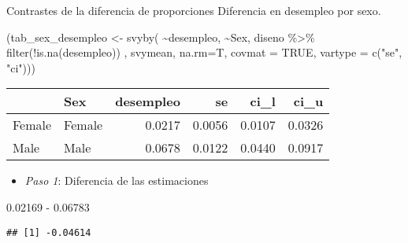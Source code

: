 \documentclass[
  ignorenonframetext,
]{beamer}
\newenvironment{Shaded}{\begin{snugshade}}{\end{snugshade}}
\newcommand{\AttributeTok}[1]{\textcolor[rgb]{0.77,0.63,0.00}{#1}}
\newcommand{\ConstantTok}[1]{\textcolor[rgb]{0.00,0.00,0.00}{#1}}
\newcommand{\FloatTok}[1]{\textcolor[rgb]{0.00,0.00,0.81}{#1}}
\newcommand{\FunctionTok}[1]{\textcolor[rgb]{0.00,0.00,0.00}{#1}}
\newcommand{\NormalTok}[1]{#1}
\newcommand{\OtherTok}[1]{\textcolor[rgb]{0.56,0.35,0.01}{#1}}
\newcommand{\SpecialCharTok}[1]{\textcolor[rgb]{0.00,0.00,0.00}{#1}}
\newcommand{\StringTok}[1]{\textcolor[rgb]{0.31,0.60,0.02}{#1}}
\providecommand{\tightlist}{%
  \setlength{\itemsep}{0pt}\setlength{\parskip}{0pt}}
\begin{document}
\begin{frame}[fragile]{Contrastes de la diferencia de proporciones}
\protect\hypertarget{contrastes-de-la-diferencia-de-proporciones-1}{}
Diferencia en desempleo por sexo.

\begin{Shaded}
\begin{Highlighting}[]
\NormalTok{(tab\_sex\_desempleo }\OtherTok{\textless{}{-}} \FunctionTok{svyby}\NormalTok{(}
  \SpecialCharTok{\textasciitilde{}}\NormalTok{desempleo, }\SpecialCharTok{\textasciitilde{}}\NormalTok{Sex, }
\NormalTok{    diseno }\SpecialCharTok{\%\textgreater{}\%} \FunctionTok{filter}\NormalTok{(}\SpecialCharTok{!}\FunctionTok{is.na}\NormalTok{(desempleo)) , }
\NormalTok{     svymean, }\AttributeTok{na.rm=}\NormalTok{T, }\AttributeTok{covmat =} \ConstantTok{TRUE}\NormalTok{,}
     \AttributeTok{vartype =} \FunctionTok{c}\NormalTok{(}\StringTok{"se"}\NormalTok{, }\StringTok{"ci"}\NormalTok{)))}
\end{Highlighting}
\end{Shaded}

\begin{tabular}{l|l|r|r|r|r}
\hline
  & Sex & desempleo & se & ci\_l & ci\_u\\
\hline
Female & Female & 0.0217 & 0.0056 & 0.0107 & 0.0326\\
\hline
Male & Male & 0.0678 & 0.0122 & 0.0440 & 0.0917\\
\hline
\end{tabular}

\begin{itemize}[<+->]
\tightlist
\item
  \emph{Paso 1}: Diferencia de las estimaciones
\end{itemize}

\begin{Shaded}
\begin{Highlighting}[]
\FloatTok{0.02169} \SpecialCharTok{{-}} \FloatTok{0.06783}   
\end{Highlighting}
\end{Shaded}

\begin{verbatim}
## [1] -0.04614
\end{verbatim}
\end{frame}
\end{document}
